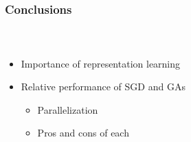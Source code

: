 
\begin{frame}[t]
	\frametitle{Conclusions}
	\framesubtitle{~~}  %
	\begin{itemize}
		\item Importance of representation learning
		\item Relative performance of SGD and GAs
			\begin{itemize}
				\item Parallelization
				\item Pros and cons of each
			\end{itemize}
	\end{itemize}

\end{frame}


